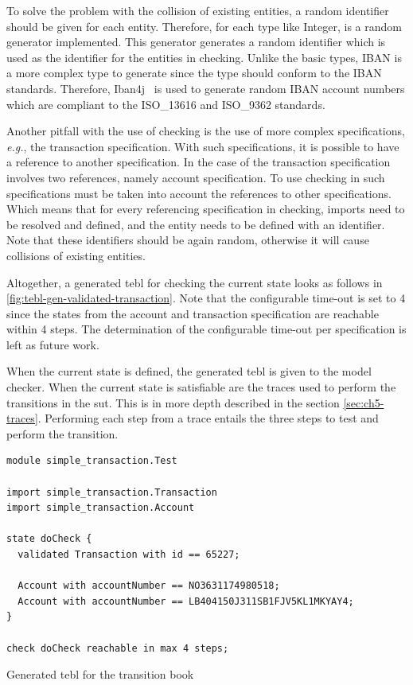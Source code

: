 To solve the
problem with the collision of existing entities, a random identifier should be
given for each entity. Therefore, for each type like Integer, is a random
generator implemented. This generator generates a random identifier which is
used as the identifier for the entities in checking. Unlike the basic types,
IBAN is a more complex type to generate since the type should conform to the
IBAN standards. Therefore, Iban4j~\cite{iban4j} is used to generate random IBAN
account numbers which are compliant to the ISO\_13616 and ISO\_9362 standards.

Another pitfall with the use of checking is the use of more complex
specifications, \textit{e.g.}, the transaction specification. With such
specifications, it is possible to have a reference to another specification. In
the case of the transaction specification involves two references, namely
account specification. To use checking in such specifications must be taken into
account the references to other specifications. Which means that for every
referencing specification in checking, imports need to be resolved and defined,
and the entity needs to be defined with an identifier. Note that these
identifiers should be again random, otherwise it will cause collisions of
existing entities.

Altogether, a generated tebl for checking the current state looks as follows in
\autoref{fig:tebl-gen-validated-transaction}. Note that the configurable
time-out is set to 4 since the states from the account and transaction
specification are reachable within 4 steps. The determination of the
configurable time-out per specification is left as future work.

When the current state is defined, the generated tebl is given to the model
checker. When the current state is satisfiable are the traces used to perform
the transitions in the \gls{sut}. This is in more depth described in the section
\autoref{sec:ch5-traces}. Performing each step from a trace entails the three
steps to test and perform the transition.

\begin{sourcecode}[h!]
\begin{lstlisting}[]
module simple_transaction.Test

import simple_transaction.Transaction
import simple_transaction.Account

state doCheck {
  validated Transaction with id == 65227;

  Account with accountNumber == NO3631174980518;
  Account with accountNumber == LB404150J311SB1FJV5KL1MKYAY4;
}

check doCheck reachable in max 4 steps;
\end{lstlisting}
\caption{Generated tebl for the transition book}\label{fig:tebl-gen-validated-transaction}
\end{sourcecode}
\FloatBarrier

